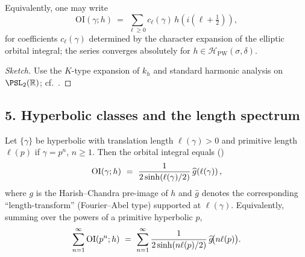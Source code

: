\begin{lemma}\relax\hspace{0pt}
\label{lem:tfc4-elliptic-sph} %
Equivalently, one may write
\[
\mathrm{OI}(\gamma;h)\ =\ \sum_{\ell\ge 0} c_\ell(\gamma)\,h(i(\ell+\tfrac12)),
\]
for coefficients $c_\ell(\gamma)$ determined by the character expansion of the elliptic orbital integral; the series converges absolutely for $h\in\mathcal{H}_{\mathrm{PW}}(\sigma,\delta)$.\relax\hspace{0pt}
\end{lemma}

\begin{proof}[Sketch]\relax\hspace{0pt}
Use the $K$-type expansion of $k_h$ and standard harmonic analysis on $\PSL_2(\mathbb{R})$; cf.\ \cite{GangolliVaradarajan,HejhalI}.\relax\hspace{0pt}
\end{proof}

\subsection*{5. Hyperbolic classes and the length spectrum}\relax\hspace{0pt}
\label{subsec:tfc4-hyp} %

Let $\{\gamma\}$ be hyperbolic with translation length $\ell(\gamma)>0$ and primitive length $\ell(p)$ if $\gamma=p^n$, $n\ge 1$. \relax\hspace{0pt}
Then the orbital integral equals (\cite{SelbergCollected,HejhalI})
\begin{equation}\relax\hspace{0pt}
\label{eq:tfc4-hyp-OI}\relax\hspace{0pt}
\mathrm{OI}(\gamma;h)\ =\ \frac{1}{2\sinh(\ell(\gamma)/2)}\,\widehat{g}\!\left(\ell(\gamma)\right),
\end{equation}
where $g$ is the Harish--Chandra pre-image of $h$ and $\widehat{g}$ denotes the corresponding ``length-transform'' (Fourier--Abel type) supported at $\ell(\gamma)$.\relax\hspace{0pt}
Equivalently, summing over the powers of a primitive hyperbolic $p$,
\begin{equation}\relax\hspace{0pt}
\label{eq:tfc4-hyp-sum}\relax\hspace{0pt}
\sum_{n=1}^{\infty} \mathrm{OI}(p^n;h)\ =\ \sum_{n=1}^{\infty}\frac{1}{2\sinh(n\ell(p)/2)}\,\widehat{g}\!\big(n\ell(p)\big).
\end{equation}


